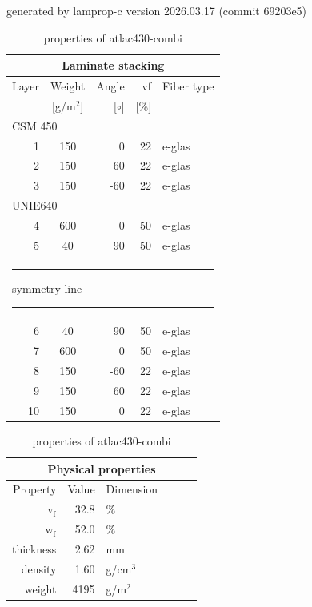 \begin{table}[!htbp]
  \caption{\label{tab:atlac430-combi}properties of atlac430-combi}
  \centering\footnotesize{\rule{0pt}{10pt}
  \tiny generated by lamprop-c version 2026.03.17 (commit 69203e5)\\[3pt]}
    \begin{tabular}[t]{rcrrl}
      \multicolumn{5}{c}{\small\textbf{Laminate stacking}}\\[0.1em]
      \toprule %
      Layer & Weight & Angle & vf & Fiber type\\
            & [g/m$^2$] & [$\circ$] & [\%]\\
      \midrule
      \multicolumn{5}{l}{CSM 450}\\
        1 &    150 &     0 &   22 & e-glas\\
        2 &    150 &    60 &   22 & e-glas\\
        3 &    150 &   -60 &   22 & e-glas\\
      \multicolumn{5}{l}{UNIE640}\\
        4 &    600 &     0 &   50 & e-glas\\
        5 &     40 &    90 &   50 & e-glas\\
      \multicolumn{5}{l}{\rule[0.5ex]{10mm}{1pt}symmetry line\rule[0.5ex]{10mm}{1pt}}\\
        6 &     40 &    90 &   50 & e-glas\\
        7 &    600 &     0 &   50 & e-glas\\
        8 &    150 &   -60 &   22 & e-glas\\
        9 &    150 &    60 &   22 & e-glas\\
       10 &    150 &     0 &   22 & e-glas\\
      \bottomrule
    \end{tabular}\hspace{0.02\textwidth}
    \begin{tabular}[t]{rrlrrl}
      \multicolumn{6}{c}{\small\textbf{Physical properties}}\\[0.1em]
      \toprule
      Property & Value & Dimension\\
      \midrule
      $\mathrm{v_f}$ & 32.8 &\%\\
      $\mathrm{w_f}$ & 52.0 &\%\\
      thickness & 2.62 & mm\\
      density & 1.60 & g/cm$^3$\\
      weight & 4195 & g/m$^2$\\

\end{tabular}
\end{table}
